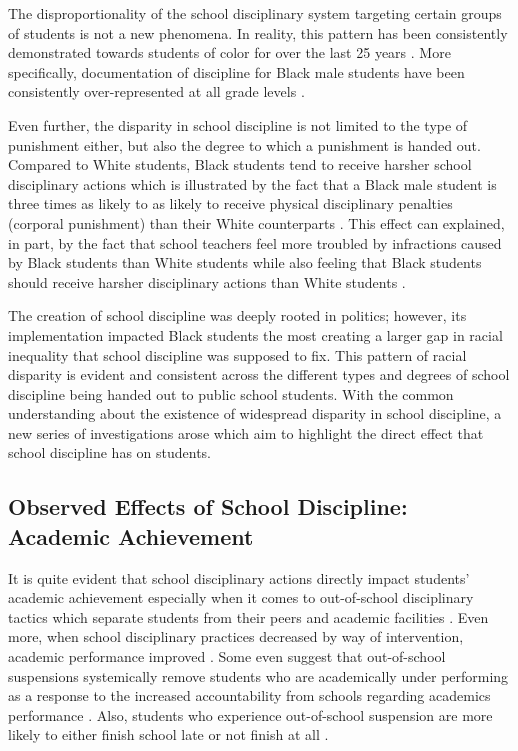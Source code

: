 \documentclass[12pt]{article}
\begin{document}
The disproportionality of the school disciplinary system targeting certain groups of students is not a new phenomena. In reality, this pattern has been consistently demonstrated towards students of color for over the last 25 years \cite{Skiba2002}. More specifically, documentation of discipline for Black male students have been consistently over-represented at all grade levels \cite{RaffaeleMendez2003}. 

Even further, the disparity in school discipline is not limited to the type of punishment either, but also the degree to which a punishment is handed out. Compared to White students, Black students tend to receive harsher school disciplinary actions which is illustrated by the fact that a Black male student is three times as likely to as likely to receive physical disciplinary penalties (corporal punishment) than their White counterparts \cite{Gregory1995}. This effect can explained, in part, by the fact that school teachers feel more troubled by infractions caused by Black students than White students while also feeling that Black students should receive harsher disciplinary actions than White students \cite{Okonofua2015}.

The creation of school discipline was deeply rooted in politics; however, its implementation impacted Black students the most creating a larger gap in racial inequality that school discipline was supposed to fix. This pattern of racial disparity is evident and consistent across the different types and degrees of school discipline being handed out to public school students. With the common understanding about the existence of widespread disparity in school discipline, a new series of investigations arose which aim to highlight the direct effect that school discipline has on students.



\subsection*{Observed Effects of School Discipline: Academic Achievement}
It is quite evident that school disciplinary actions directly impact students' academic achievement especially when it comes to out-of-school disciplinary tactics which separate students from their peers and academic facilities \cite{RaffaeleMendez2003}. Even more, when school disciplinary practices decreased by way of intervention, academic performance improved \cite{Graham2011}. Some even suggest that out-of-school suspensions systemically remove students who are academically under performing as a response to the increased accountability from schools regarding academics performance \cite{Ali2008}. Also, students who experience out-of-school suspension are more likely to either finish school late or not finish at all \cite{Mendez2002}.  
\end{document}
